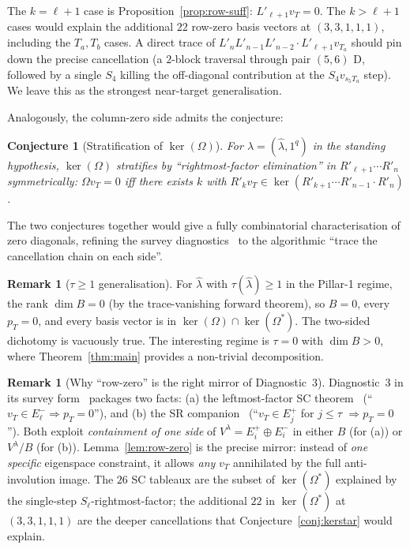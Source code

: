 \documentclass[11pt]{article}
\newtheorem{conjecture}[theorem]{Conjecture}
\theoremstyle{definition}
\newtheorem{remark}[theorem]{Remark}
\newcommand{\Vlam}{V^\lambda}
\newcommand{\Om}{\Omega}
\newcommand{\Omstar}{\Omega^{\ast}}
\newcommand{\hatl}{\widehat\lambda}
\newcommand{\Rp}{{R'}}
\newcommand{\Lp}{{L'}}
\newcommand{\Eplus}{E^+}
\newcommand{\Eminus}{E^-}
\newcommand{\pT}{p_T}
\begin{document}
The $k = \ell+1$ case is Proposition~\ref{prop:row-suff}: $\Lp_{\ell+1}
v_T = 0$. The $k > \ell+1$ cases would explain the additional $22$
row-zero basis vectors at $(3,3,1,1,1)$, including the $T_a, T_b$ cases.
A direct trace of $\Lp_n \Lp_{n-1} \Lp_{n-2} \cdot \Lp_{\ell+1} v_{T_a}$
should pin down the precise cancellation (a $2$-block traversal through
pair $(5, 6)$ D, followed by a single $S_4$ killing the off-diagonal
contribution at the $S_4 v_{s_5 T_a}$ step). We leave this as the
strongest near-target generalisation.

Analogously, the column-zero side admits the conjecture:

\begin{conjecture}[Stratification of $\ker(\Om)$]\label{conj:keromega}
For $\lambda = (\hatl, 1^q)$ in the standing hypothesis, $\ker(\Om)$
stratifies by ``rightmost-factor elimination'' in $\Rp_{\ell+1} \cdots
\Rp_n$ symmetrically: $\Om v_T = 0$ iff there exists $k$ with
$\Rp_k v_T \in \ker(\Rp_{k+1} \cdots \Rp_{n-1} \cdot \Rp_n)$.
\end{conjecture}

The two conjectures together would give a fully combinatorial
characterisation of zero diagonals, refining the survey
diagnostics~\cite[\S7]{survey} to the algorithmic
``trace the cancellation chain on each side''.

\begin{remark}[$\tau \ge 1$ generalisation]
For $\hatl$ with $\tau(\hatl) \ge 1$ in the Pillar-1 regime, the rank
$\dim B = 0$ (by the trace-vanishing forward theorem), so $B = 0$, every
$\pT = 0$, and every basis vector is in $\ker(\Om) \cap \ker(\Omstar)$.
The two-sided dichotomy is vacuously true. The interesting regime is
$\tau = 0$ with $\dim B > 0$, where Theorem~\ref{thm:main} provides a
non-trivial decomposition.
\end{remark}

\begin{remark}[Why ``row-zero'' is the right mirror of Diagnostic~3]
Diagnostic~3 in its survey form~\cite[\S7]{survey} packages two facts:
(a) the leftmost-factor SC theorem~\cite[Thm.~1]{leftmostPerSYT}
(``$v_T \in \Eminus_\ell \Rightarrow \pT = 0$''), and
(b) the SR companion~\cite[Thm.~1]{srCompanion}
(``$v_T \in \Eplus_j$ for $j \le \tau$ $\Rightarrow \pT = 0$''). Both
exploit \emph{containment of one side} of $\Vlam = \Eplus_i \oplus
\Eminus_i$ in either $B$ (for (a)) or $\Vlam / B$ (for (b)).
Lemma~\ref{lem:row-zero} is the precise mirror: instead of \emph{one
specific} eigenspace constraint, it allows \emph{any} $v_T$
annihilated by the full anti-involution image. The $26$ SC tableaux are
the subset of $\ker(\Omstar)$ explained by the single-step
$S_\ell$-rightmost-factor; the additional $22$ in $\ker(\Omstar)$ at
$(3,3,1,1,1)$ are the deeper cancellations that
Conjecture~\ref{conj:kerstar} would explain.
\end{remark}
\end{document}
